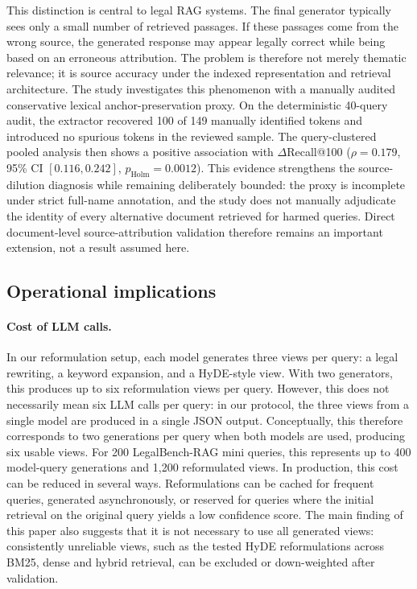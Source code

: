 \documentclass[a4paper,fleqn]{cas-dc}
\begin{document}
This distinction is central to legal RAG systems. The final generator typically sees only a small number of retrieved passages. If these passages come from the wrong source, the generated response may appear legally correct while being based on an erroneous attribution. The problem is therefore not merely thematic relevance; it is source accuracy under the indexed representation and retrieval architecture.
The study investigates this phenomenon with a manually audited
conservative lexical anchor-preservation proxy. On the deterministic
40-query audit, the extractor recovered 100 of 149 manually identified
tokens and introduced no spurious tokens in the reviewed sample. The
query-clustered pooled analysis then shows a positive association with
$\Delta$Recall@100 ($\rho=0.179$, 95\% CI $[0.116,0.242]$,
$p_{\mathrm{Holm}}=0.0012$). This evidence strengthens the
source-dilution diagnosis while remaining deliberately bounded: the proxy
is incomplete under strict full-name annotation, and the study does not
manually adjudicate the identity of every alternative document retrieved
for harmed queries. Direct document-level source-attribution validation
therefore remains an important extension, not a result assumed here.
\subsection{Operational implications}
\label{sec:disc-operational}
\paragraph{Cost of LLM calls.}
In our reformulation setup, each model generates three views per query: a legal rewriting, a keyword expansion, and a HyDE-style view. With two generators, this produces up to six reformulation views per query. However, this does not necessarily mean six LLM calls per query: in our protocol, the three views from a single model are produced in a single JSON output. Conceptually, this therefore corresponds to two generations per query when both models are used, producing six usable views. For 200 LegalBench-RAG mini queries, this represents up to 400 model-query generations and 1,200 reformulated views.
In production, this cost can be reduced in several ways. Reformulations can be cached for frequent queries, generated asynchronously, or reserved for queries where the initial retrieval on the original query yields a low confidence score. The main finding of this paper also suggests that it is not necessary to use all generated views: consistently unreliable views, such as the tested HyDE reformulations across BM25, dense and hybrid retrieval, can be excluded or down-weighted after validation.
\end{document}
